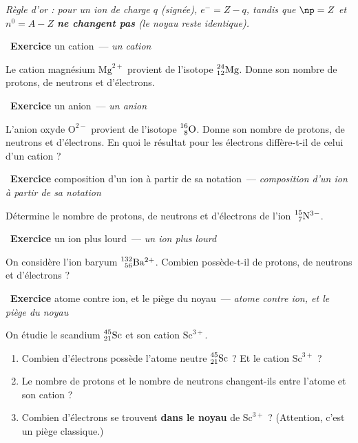 \documentclass[11pt,a4paper]{article}
\newcommand{\nuc}[3]{\prescript{#1}{#2}{\mathrm{#3}}}
\newcommand{\ee}{e^{-}}
\newcommand{\nz}{n^{0}}
\newcounter{exo}
\newcommand{\exo}[1][]{\stepcounter{exo}\par\medskip%
  \noindent{\color{primary}\rule[-2pt]{3.5pt}{15pt}}\ \textbf{\color{primarydark}\large Exercice \theexo}%
  \ifx\relax#1\relax\relax\else\ \textmd{\normalsize\color{black!65}— \itshape #1}\fi\par\nopagebreak\smallskip}
\begin{document}

\vspace{3pt}
{\small\itshape Règle d'or : pour un ion de charge $q$ (signée), $\ee = Z - q$, tandis que $\np = Z$ et
$\nz = A - Z$ \textbf{ne changent pas} (le noyau reste identique).}

\exo[un cation]
Le cation magnésium $\mathrm{Mg}^{2+}$ provient de l'isotope $\nuc{24}{12}{Mg}$. Donne son nombre de
protons, de neutrons et d'électrons.

\exo[un anion]
L'anion oxyde $\mathrm{O}^{2-}$ provient de l'isotope $\nuc{16}{8}{O}$. Donne son nombre de protons, de
neutrons et d'électrons. En quoi le résultat pour les électrons diffère-t-il de celui d'un cation ?

\exo[composition d'un ion à partir de sa notation]
Détermine le nombre de protons, de neutrons et d'électrons de l'ion $\nuc{15}{7}{N}^{3-}$.

\exo[un ion plus lourd]
On considère l'ion baryum $\nuc{132}{56}{Ba}^{2+}$. Combien possède-t-il de protons, de neutrons et
d'électrons ?

\exo[atome contre ion, et le piège du noyau]
On étudie le scandium $\nuc{45}{21}{Sc}$ et son cation $\mathrm{Sc}^{3+}$.
\begin{enumerate}[label=\alph*)]
  \item Combien d'électrons possède l'atome neutre $\nuc{45}{21}{Sc}$ ? Et le cation
        $\mathrm{Sc}^{3+}$ ?
  \item Le nombre de protons et le nombre de neutrons changent-ils entre l'atome et son cation ?
  \item Combien d'électrons se trouvent \textbf{dans le noyau} de $\mathrm{Sc}^{3+}$ ? (Attention, c'est
        un piège classique.)
\end{enumerate}
\end{document}
